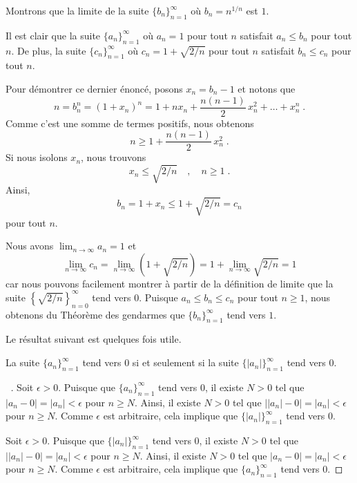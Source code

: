{\begin{egg}[\theory\ \eng]
Montrons que la limite de la suite
$\displaystyle \{ b_n\}_{n=1}^\infty$ où $b_n = n^{1/n}$ est $1$.

Il est clair que la suite
$\displaystyle \{ a_n\}_{n=1}^\infty$ où $a_n = 1$ pour tout
$n$ satisfait $a_n \leq b_n$ pour tout $n$.  De plus, la suite
$\displaystyle \{ c_n\}_{n=1}^\infty$ où $c_n = 1+\sqrt{2/n}$ pour
tout $n$ satisfait $b_n \leq  c_n$ pour tout $n$.

Pour démontrer ce dernier énoncé, posons $x_n = b_n-1$ et
notons que
\[
n = b_n^n = (1+x_n)^n
= 1 + nx_n + \frac{n(n-1)}{2}\,x_n^2 + \ldots + x_n^n \; .
\]
Comme c'est une somme de termes positifs, nous obtenons
\[
n \geq 1 + \frac{n(n-1)}{2}\,x_n^2 \; .
\]
Si nous isolons $x_n$, nous trouvons
\[
x_n \leq \sqrt{2/n} \quad , \quad n \geq 1 \; .
\]
Ainsi,
\[
b_n = 1 + x_n \leq 1 + \sqrt{2/n} = c_n
\]
pour tout $n$.

Nous avons $\displaystyle \lim_{n\rightarrow \infty} a_n = 1$ et
\[
\lim_{n\rightarrow \infty} c_n = \lim_{n\rightarrow \infty}
\left(1+ \sqrt{2/n} \right) = 1 + \lim_{n\rightarrow \infty} \sqrt{2/n} = 1
\]
car nous pouvons facilement montrer à partir de la définition de limite que
la suite $\displaystyle \left\{ \sqrt{2/n} \right\}_{n=0}^\infty$ tend
vers $0$.  Puisque $a_n \leq b_n \leq c_n$ pour tout $n \geq 1$, nous
obtenons du Théorème des gendarmes que
$\displaystyle \{ b_n\}_{n=1}^\infty$ tend vers $1$.
\end{egg}

Le résultat suivant est quelques fois utile.

\begin{theorem}
La suite $\displaystyle \{ a_n\}_{n=1}^\infty$ tend vers $0$ si et
seulement si la suite $\displaystyle \{ |a_n| \}_{n=1}^\infty$ tend vers
$0$. \label{suiteAbs}
\end{theorem}

\begin{proof}[\UOproof\ \theory]
\subQ{$\Rightarrow$} Soit $\epsilon>0$. Puisque que
$\displaystyle \{ a_n\}_{n=1}^\infty$ 
tend vers $0$, il existe $N>0$ tel que $|a_n- 0 | = |a_n| <\epsilon$
pour $n\geq N$.  Ainsi, il existe $N>0$ tel que
$\big| |a_n|- 0 \big| = |a_n| <\epsilon$ pour $n\geq N$.  Comme
$\epsilon$ est arbitraire, cela implique que
$\displaystyle \{|a_n|\}_{n=1}^\infty$ tend vers $0$.

\subQ{$\Leftarrow$} Soit $\epsilon>0$. Puisque que
$\displaystyle \{ |a_n|\}_{n=1}^\infty$ tend vers $0$, il existe $N>0$
tel que $\big| |a_n|- 0 \big| = |a_n| <\epsilon$ pour $n\geq N$.
Ainsi, il existe $N>0$ tel que $|a_n- 0| = |a_n| <\epsilon$ pour
$n\geq N$.  Comme $\epsilon$ est arbitraire, cela implique que
$\displaystyle \{a_n\}_{n=1}^\infty$ tend vers $0$.
\end{proof}

}
